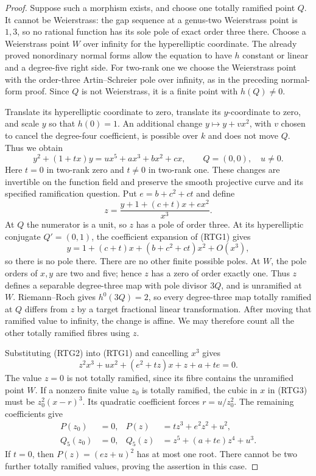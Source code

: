 \begin{proof}
Suppose such a morphism exists, and choose one totally ramified point
$Q$. It cannot be Weierstrass: the gap sequence at a genus-two
Weierstrass point is $1,3$, so no rational function has its sole pole
of exact order three there. Choose a Weierstrass point $W$ over
infinity for the hyperelliptic coordinate. The already proved
nonordinary normal forms allow the equation to have $h$ constant
or linear and a degree-five right side. For two-rank one we choose
the Weierstrass point with the order-three Artin--Schreier pole over
infinity, as in the preceding normal-form proof. Since $Q$ is not
Weierstrass, it is a finite point with $h(Q)\ne0$.

Translate its hyperelliptic coordinate to zero, translate its
$y$-coordinate to zero, and scale $y$ so that $h(0)=1$.
An additional change $y\mapsto y+v x^2$, with $v$ chosen to cancel
the degree-four coefficient, is possible over $k$ and does not move
$Q$. Thus we obtain
\[
 y^2+(1+t x)y=u x^5+a x^3+b x^2+c x,
 \qquad Q=(0,0),\quad u\ne0.                         \tag{RTG1}
\]
Here $t=0$ in two-rank zero and $t\ne0$ in two-rank one. These
changes are invertible on the function field and preserve the
smooth projective curve and its specified ramification question.
Put $e=b+c^2+ct$ and define
\[
                 z=\frac{y+1+(c+t)x+e x^2}{x^3}.       \tag{RTG2}
\]
At $Q$ the numerator is a unit, so $z$ has a pole of order three.
At its hyperelliptic conjugate $Q'=(0,1)$, the coefficient expansion
of (RTG1) gives
\[
        y=1+(c+t)x+(b+c^2+ct)x^2+O(x^3),
\]
so there is no pole there. There are no other finite possible poles.
At $W$, the pole orders of $x,y$ are two and five; hence $z$ has
a zero of order exactly one. Thus $z$ defines a separable degree-three
map with pole divisor $3Q$, and is unramified at $W$.
Riemann--Roch gives $h^0(3Q)=2$, so every degree-three map totally
ramified at $Q$ differs from $z$ by a target fractional linear
transformation. After moving that ramified value to infinity, the
change is affine. We may therefore count all the other totally
ramified fibres using $z$.

Substituting (RTG2) into (RTG1) and cancelling $x^3$ gives
\[
 z^2x^3+u x^2+(e^2+t z)x+z+a+te=0.                    \tag{RTG3}
\]
The value $z=0$ is not totally ramified, since its fibre contains
the unramified point $W$. If a nonzero finite value $z_0$ is totally
ramified, the cubic in $x$ in (RTG3) must be
$z_0^2(x-r)^3$. Its quadratic coefficient forces $r=u/z_0^2$.
The remaining coefficients give
\[
 \begin{aligned}
 P(z_0)&=0,&P(z)&=t z^3+e^2z^2+u^2,\\
 Q_5(z_0)&=0,&Q_5(z)&=z^5+(a+te)z^4+u^3.
 \end{aligned}                                       \tag{RTG4}
\]
If $t=0$, then $P(z)=(ez+u)^2$ has at most one root. There
cannot be two further totally ramified values, proving the assertion
in this case.


\end{proof}
